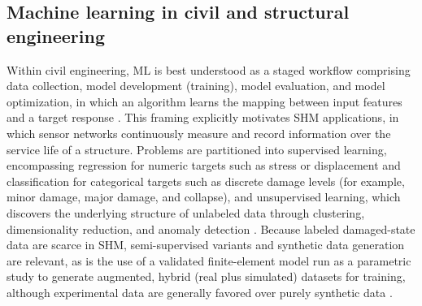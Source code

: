 \subsection{Machine learning in civil and structural engineering}\label{subsec:ml-civil}

Within civil engineering, ML is best understood as a staged workflow comprising data collection, model development (training), model evaluation, and model optimization, in which an algorithm learns the mapping between input features and a target response \citep{naser2023ml}. This framing explicitly motivates SHM applications, in which sensor networks continuously measure and record information over the service life of a structure. Problems are partitioned into supervised learning, encompassing regression for numeric targets such as stress or displacement and classification for categorical targets such as discrete damage levels (for example, minor damage, major damage, and collapse), and unsupervised learning, which discovers the underlying structure of unlabeled data through clustering, dimensionality reduction, and anomaly detection \citep{naser2023ml}. Because labeled damaged-state data are scarce in SHM, semi-supervised variants and synthetic data generation are relevant, as is the use of a validated finite-element model run as a parametric study to generate augmented, hybrid (real plus simulated) datasets for training, although experimental data are generally favored over purely synthetic data \citep{naser2023ml,karaaslan2021attention}.

